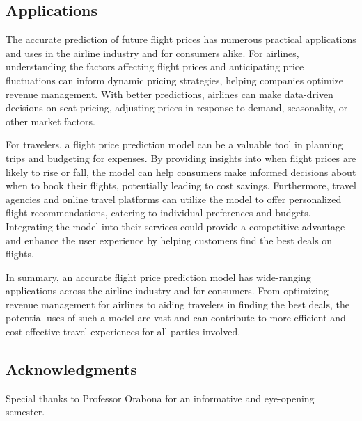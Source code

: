 \documentclass{article}
\begin{document}
\subsection{Applications}

The accurate prediction of future flight prices has numerous practical applications and uses in the airline industry and for consumers alike. For airlines, understanding the factors affecting flight prices and anticipating price fluctuations can inform dynamic pricing strategies, helping companies optimize revenue management. With better predictions, airlines can make data-driven decisions on seat pricing, adjusting prices in response to demand, seasonality, or other market factors.

For travelers, a flight price prediction model can be a valuable tool in planning trips and budgeting for expenses. By providing insights into when flight prices are likely to rise or fall, the model can help consumers make informed decisions about when to book their flights, potentially leading to cost savings. Furthermore, travel agencies and online travel platforms can utilize the model to offer personalized flight recommendations, catering to individual preferences and budgets. Integrating the model into their services could provide a competitive advantage and enhance the user experience by helping customers find the best deals on flights.

In summary, an accurate flight price prediction model has wide-ranging applications across the airline industry and for consumers. From optimizing revenue management for airlines to aiding travelers in finding the best deals, the potential uses of such a model are vast and can contribute to more efficient and cost-effective travel experiences for all parties involved.

\subsection{Acknowledgments}

Special thanks to Professor Orabona for an informative and eye-opening semester.

\pagebreak






\end{document}
